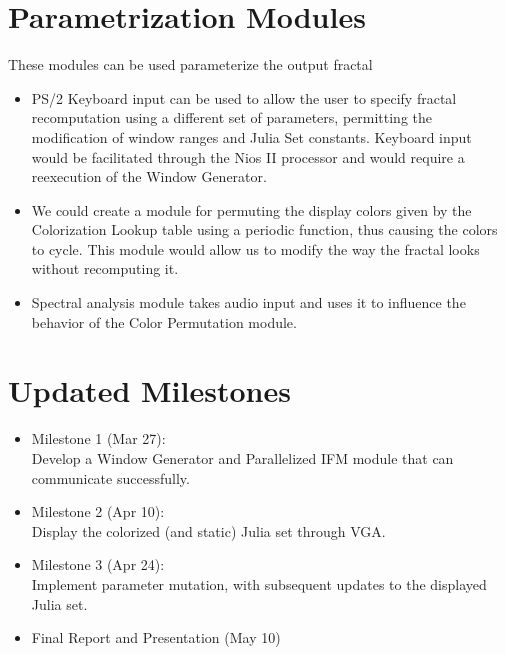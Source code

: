 \documentclass{article}
\begin{document}
\section{Parametrization Modules}

These modules can be used parameterize the output fractal

\begin{itemize}
\item PS/2 Keyboard input can be used to allow the user to specify
  fractal recomputation using a different set of parameters,
  permitting the modification of window ranges and Julia Set
  constants. Keyboard input would be facilitated through the Nios II
  processor and would require a reexecution of the Window Generator.
\item We could create a module for permuting the display colors given
  by the Colorization Lookup table using a periodic function, thus
  causing the colors to cycle. This module would allow us to modify
  the way the fractal looks without recomputing it.
\item Spectral analysis module takes audio input and uses it to
  influence the behavior of the Color Permutation module.
\end{itemize}


\section{Updated Milestones}

\begin{itemize}
\item Milestone 1 (Mar 27): \\
  Develop a Window Generator and
  Parallelized IFM module that can communicate successfully.
\item Milestone 2 (Apr 10): \\
  Display the colorized (and static) Julia set through VGA.
\item Milestone 3 (Apr 24): \\ 
  Implement parameter mutation, with subsequent updates to the
  displayed Julia set.
\item Final Report and Presentation (May 10)
\end{itemize}
\end{document}
